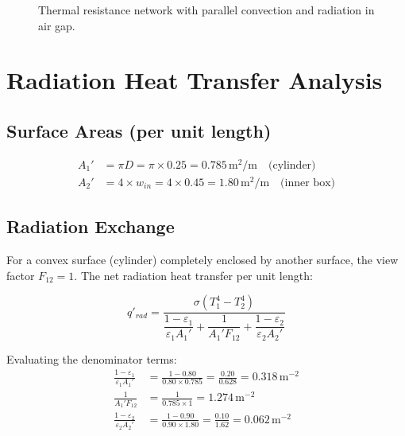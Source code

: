 \documentclass[11pt]{article}
\newcommand{\unit}[1]{\,\mathrm{#1}}
\begin{document}
\begin{figure}[H]
\caption{Thermal resistance network with parallel convection and radiation in air gap.}
\label{fig:network}
\end{figure}

\section{Radiation Heat Transfer Analysis}

\subsection{Surface Areas (per unit length)}

\begin{align}
    A_1' &= \pi D = \pi \times 0.25 = 0.785\unit{m^2/m} \quad \text{(cylinder)} \\
    A_2' &= 4 \times w_{in} = 4 \times 0.45 = 1.80\unit{m^2/m} \quad \text{(inner box)}
\end{align}

\subsection{Radiation Exchange}

For a convex surface (cylinder) completely enclosed by another surface, the view factor $F_{12} = 1$. The net radiation heat transfer per unit length:

\begin{equation}
    q'_{rad} = \frac{\sigma(T_1^4 - T_2^4)}{\dfrac{1-\varepsilon_1}{\varepsilon_1 A_1'} + \dfrac{1}{A_1' F_{12}} + \dfrac{1-\varepsilon_2}{\varepsilon_2 A_2'}}
\end{equation}

Evaluating the denominator terms:
\begin{align}
    \frac{1-\varepsilon_1}{\varepsilon_1 A_1'} &= \frac{1-0.80}{0.80 \times 0.785} = \frac{0.20}{0.628} = 0.318\unit{m^{-2}} \\
    \frac{1}{A_1' F_{12}} &= \frac{1}{0.785 \times 1} = 1.274\unit{m^{-2}} \\
    \frac{1-\varepsilon_2}{\varepsilon_2 A_2'} &= \frac{1-0.90}{0.90 \times 1.80} = \frac{0.10}{1.62} = 0.062\unit{m^{-2}}
\end{align}
\end{document}
